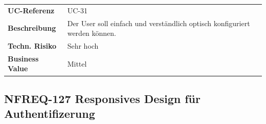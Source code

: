\begin{longtable}[c]{@{}ll@{}}
\toprule
\begin{minipage}[t]{0.20\columnwidth}\raggedright\strut
\textbf{UC-Referenz}
\strut\end{minipage} &
\begin{minipage}[t]{0.74\columnwidth}\raggedright\strut
UC-31
\strut\end{minipage}\tabularnewline
\begin{minipage}[t]{0.20\columnwidth}\raggedright\strut
\textbf{Beschreibung}
\strut\end{minipage} &
\begin{minipage}[t]{0.74\columnwidth}\raggedright\strut
Der User soll einfach und verständlich optisch konfiguriert werden
können.
\strut\end{minipage}\tabularnewline
\begin{minipage}[t]{0.20\columnwidth}\raggedright\strut
\textbf{Techn. Risiko}
\strut\end{minipage} &
\begin{minipage}[t]{0.74\columnwidth}\raggedright\strut
Sehr hoch
\strut\end{minipage}\tabularnewline
\begin{minipage}[t]{0.20\columnwidth}\raggedright\strut
\textbf{Business Value}
\strut\end{minipage} &
\begin{minipage}[t]{0.74\columnwidth}\raggedright\strut
Mittel
\strut\end{minipage}\tabularnewline
\bottomrule
\end{longtable}

\subsection{NFREQ-127 Responsives Design für
Authentifizerung}\label{nfreq-127-responsives-design-fuxfcr-authentifizerung}


